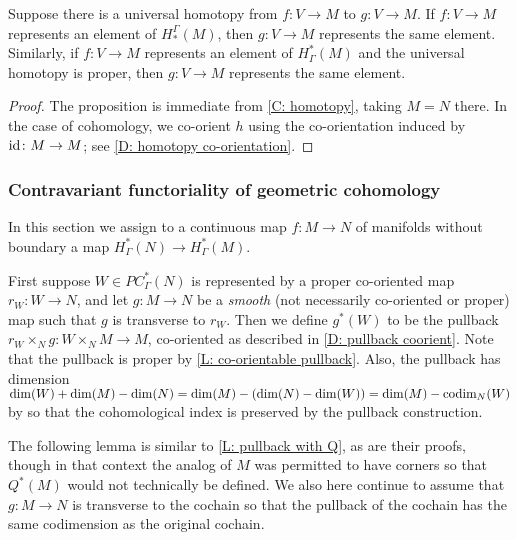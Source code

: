 \begin{proposition}\label{P: universal homotopy}
Suppose there is a universal homotopy from $f \colon V\to M$ to $g \colon V\to M$. If $f \colon V\to M$ represents an element of $H_*^\Gamma(M)$, then $g \colon V\to M$ represents the same element. Similarly, if $f \colon V\to M$ represents an element of $H^*_\Gamma(M)$ and the universal homotopy is proper, then $g \colon V\to M$ represents the same element.
\end{proposition}
\begin{proof}
The proposition is immediate from \cref{C: homotopy}, taking $M=N$ there. In the case of cohomology, we co-orient $h$ using the co-orientation induced by $\mathrm{id} \colon M \to M$; see \cref{D: homotopy co-orientation}.
\end{proof}







\subsubsection{Contravariant functoriality of geometric cohomology}\label{S: cohomology pullback}

In this section we assign to a continuous map $f \colon M \to N$ of manifolds without boundary a map $H^*_\Gamma(N) \to H^*_\Gamma(M)$.

First suppose $W \in PC^*_\Gamma(N)$ is represented by a proper co-oriented map $r_W \colon W \to N$, and let
$g \colon M \to N$ be a \textit{smooth} (not necessarily co-oriented or proper) map such that $g$ is transverse to $r_W$.
Then we define $g^*(W)$ to be the pullback $r_W \times_N g \colon W \times_N M \to M$, co-oriented as described in \cref{D: pullback coorient}.
Note that the pullback is proper by \cref{L: co-orientable pullback}.
Also, the pullback has dimension $\dim(W)+\dim(M)-\dim(N) = \dim(M)-(\dim(N)-\dim(W)) = \dim(M)-\text{codim}_N(W)$ by \cite[Theorem 6.4]{Joy12} so that the cohomological index is preserved by the pullback construction.

The following lemma is similar to \cref{L: pullback with Q}, as are their proofs, though in that context the analog of $M$ was permitted to have corners so that $Q^*(M)$ would not technically be defined.
We also here continue to assume that $g \colon M \to N$ is transverse to the cochain so that the pullback of the cochain has the same codimension as the original cochain.

\begin{comment}
	\red{GBF: Might want to try to combine those into a single lemma somewhere at some point, but it looks like it might be less messy, if a bit redundant, not to.}
\end{comment}

